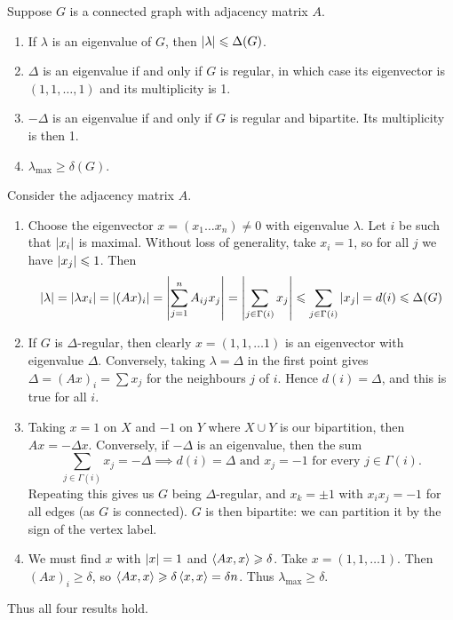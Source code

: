 \documentclass{article}
\begin{document}
\begin{proposition}
    Suppose $G$ is a connected graph with adjacency matrix $A$.
    \begin{enumerate}
	    \item If $\lambda$ is an eigenvalue of $G$, then $\left\lvert \lambda \right\rvert \leqslant \Delta(G)$.
	    \item $\Delta$ is an eigenvalue if and only if $G$ is regular, in which case its eigenvector is $(1, 1, \dots, 1)$ and its multiplicity is 1.
	    \item $-\Delta$ is an eigenvalue if and only if $G$ is regular and bipartite. Its multiplicity is then 1.
	    \item $\lambda_\text{max} \geq \delta(G)$.
	\end{enumerate}
\end{proposition}

\begin{prf}
    Consider the adjacency matrix $A$.
    \begin{enumerate}
	    \item Choose the eigenvector $x = (x_1 \dots x_n) \neq 0$ with eigenvalue $\lambda$. Let $i$ be such that $\left\lvert x_i \right\rvert$ is maximal. Without loss of generality, take $x_i = 1$, so for all $j$ we have $\left\lvert x_j \right\rvert \leqslant 1$. Then
		\[
			\left\lvert \lambda \right\rvert = \left\lvert \lambda x_i \right\rvert = \left\lvert (Ax)_i \right\rvert = \left\lvert \sum_{j=1}^n A_{ij}x_j \right\rvert = \left\lvert \sum_{j \in \Gamma(i)} x_j \right\rvert \leqslant \sum_{j \in \Gamma(i)} \left\lvert x_j \right\rvert = d(i) \leqslant \Delta(G)
		\]
		\item If $G$ is $\Delta$-regular, then clearly $x = (1,1, \dots 1)$ is an eigenvector with eigenvalue $\Delta$. Conversely, taking $\lambda = \Delta$ in the first point gives $\Delta = (Ax)_i = \sum x_j$ for the neighbours $j$ of $i$. Hence $d(i) = \Delta$, and this is true for all $i$.
		\item Taking $x = 1$ on $X$ and $-1$ on $Y$ where $X \cup Y$ is our bipartition, then $Ax = -\Delta x$. Conversely, if $-\Delta$ is an eigenvalue, then the sum
		\[
			\sum_{j \in \Gamma(i)} x_j = -\Delta \implies d(i) = \Delta \text{ and }x_j = -1 \text{ for every } j \in \Gamma(i).
		\]
		Repeating this gives us $G$ being $\Delta$-regular, and $x_k = \pm 1$ with $x_i x_j = -1$ for all edges (as $G$ is connected). $G$ is then bipartite: we can partition it by the sign of the vertex label.
		\item We must find $x$ with $\left\lvert x \right\rvert = 1$ and $\left\langle Ax, x \right\rangle \geqslant \delta$. Take $x = (1, 1, \dots 1)$. Then $(Ax)_i \geq \delta$, so $\left\langle Ax, x \right\rangle \geqslant \delta \left\langle x, x \right\rangle = \delta n$. Thus $\lambda_\text{max} \geq \delta$. 
	\end{enumerate}
	Thus all four results hold.
\end{prf}
\end{document}
